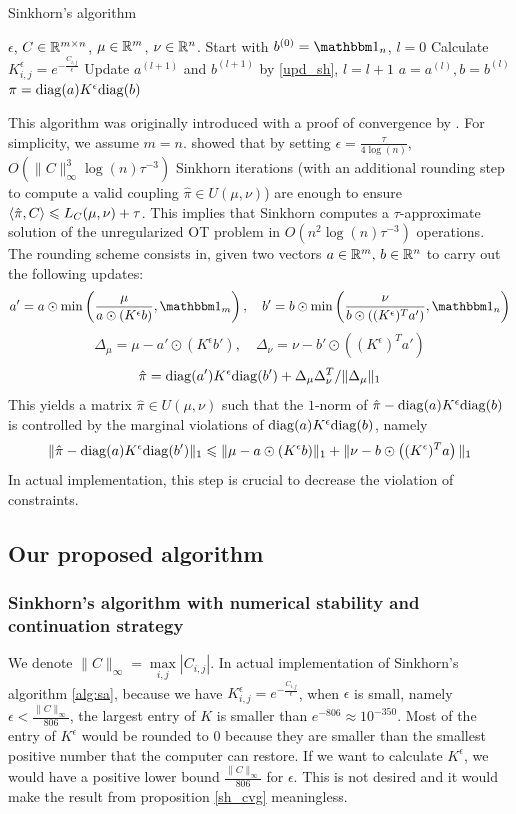\begin{algorithm}
\caption{Sinkhorn's algorithm}
\label{alg:sa}
\begin{algorithmic}[1]
\REQUIRE $\epsilon$, $C\in\mathbb{R}^{m\times n}$, $\mu\in\mathbb{R}^m$, $\nu\in\mathbb{R}^n$.
\STATE Start with $b^{(0)}=\mbone_n$, $l=0$
\STATE Calculate $K^\epsilon_{i,j}= e^{-\frac{C_{i,j}}{\epsilon}}$
	\STATE Update $a^{(l+1)}$ and $b^{(l+1)}$ by \ref{upd_sh}, $l=l+1$
\ENDWHILE
\STATE $a=a^{(l)}, b=b^{(l)}$
\RETURN $\pi=\mathrm{diag}(a)K^\epsilon \mathrm{diag}(b)$
\end{algorithmic}
\end{algorithm}

This algorithm was originally introduced with a proof of convergence by \cite{sinkhorn}. For simplicity, we assume $m=n$. \cite{nltaa} showed that by setting $\epsilon=\frac{\tau}{4\log(n)}$, $O(\|C\|_\infty^3\log(n)\tau^{-3})$ Sinkhorn iterations (with an additional
rounding step to compute a valid coupling $\hat\pi\in U(\mu,\nu)$) are enough to ensure $\left\langle \hat \pi, C\right\rangle\leqslant L_C(\mu,\nu)+\tau$. This implies that Sinkhorn computes a $\tau$-approximate solution of the unregularized OT problem in $O(n^2\log(n)\tau^{-3})$ operations. The rounding scheme consists in, given two vectors $a\in\mathbb{R}^m, \, b\in\mathbb{R}^n$ to carry out the following updates:
$$
a'=a\odot \min\left(\frac{\mu}{a\odot(K^\epsilon b)},\mbone_m\right), \quad b'=b\odot \min \left(\frac{\nu}{b\odot((K^\epsilon)^Ta')},\mbone_n\right)
$$
$$
\Delta_\mu = \mu-a'\odot(K^\epsilon b'), \quad \Delta_\nu=\nu-b'\odot\left((K^\epsilon)^Ta'\right)
$$
$$
\hat \pi = \mathrm{diag}(a') K^\epsilon\mathrm{diag} (b')+\Delta_\mu\Delta_\nu^T/\|\Delta_\mu\|_1
$$
This yields a matrix $\hat\pi\in U(\mu,\nu)$ such that the $1$-norm of $\hat \pi -\mathrm{diag}(a) K^\epsilon\mathrm{diag} (b) $ is controlled by the marginal violations of $\mathrm{diag}(a)K^\epsilon\mathrm{diag}(b)$, namely
$$
\|\hat \pi -\mathrm{diag}(a) K^\epsilon\mathrm{diag} (b')\|_1\leqslant\|\mu-a\odot(K^\epsilon b)\|_1+\|\nu-b\odot\left((K^\epsilon)^Ta\right)\|_1
$$
In actual implementation, this step is crucial to decrease the violation of constraints. 

\subsection{Our proposed algorithm}
\subsubsection{Sinkhorn's algorithm with numerical stability and continuation strategy}
We denote $\|C\|_\infty=\max\limits_{i,j}|C_{i,j}|$. In actual implementation of Sinkhorn's algorithm \ref{alg:sa}, because we have $K^\epsilon_{i,j}=e^{-\frac{C_{i,j}}{\epsilon}}$, when $\epsilon$ is small, namely $\epsilon<\frac{\|C\|_\infty}{806}$, the largest entry of $K$ is smaller than $e^{-806}\approx 10^{-350}$. Most of the entry of $K^{\epsilon}$ would be rounded to $0$ because they are smaller than the smallest positive number that the computer can restore. If we want to calculate $K^\epsilon$, we would have a positive lower bound $\frac{\|C\|_\infty}{806}$ for $\epsilon$. This is not desired and it would make the result from proposition \ref{sh_cvg} meaningless.

